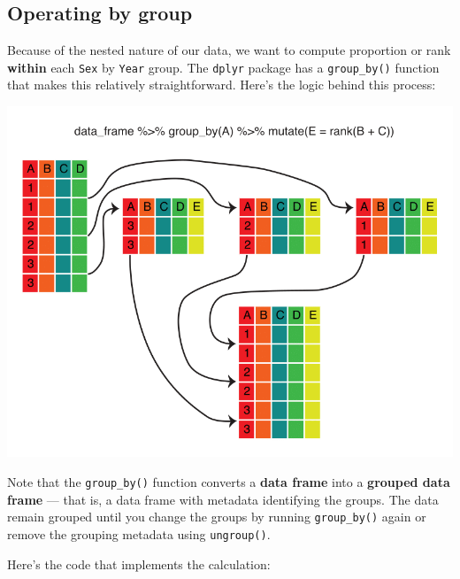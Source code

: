 \documentclass[]{book}
\newenvironment{Shaded}{\begin{snugshade}}{\end{snugshade}}
\newcommand{\CommentTok}[1]{\textcolor[rgb]{0.56,0.35,0.01}{\textit{#1}}}
\newcommand{\DataTypeTok}[1]{\textcolor[rgb]{0.13,0.29,0.53}{#1}}
\newcommand{\KeywordTok}[1]{\textcolor[rgb]{0.13,0.29,0.53}{\textbf{#1}}}
\newcommand{\NormalTok}[1]{#1}
\newcommand{\OperatorTok}[1]{\textcolor[rgb]{0.81,0.36,0.00}{\textbf{#1}}}
\newcommand{\StringTok}[1]{\textcolor[rgb]{0.31,0.60,0.02}{#1}}
\begin{document}
\hypertarget{operating-by-group}{%
\subsection{Operating by group}\label{operating-by-group}}

Because of the nested nature of our data, we want to compute proportion
or rank \textbf{within} each \texttt{Sex} by \texttt{Year} group. The \texttt{dplyr}
package has a \texttt{group\_by()} function that makes this relatively
straightforward. Here's the logic behind this process:

\includegraphics{R/Rintro/images/mutate_group_by.png}

Note that the \texttt{group\_by()} function converts a \textbf{data frame} into a
\textbf{grouped data frame} --- that is, a data frame with metadata identifying
the groups. The data remain grouped until you change the groups by
running \texttt{group\_by()} again or remove the grouping metadata using
\texttt{ungroup()}.

Here's the code that implements the calculation:

\begin{Shaded}
\end{Shaded}
\end{document}
